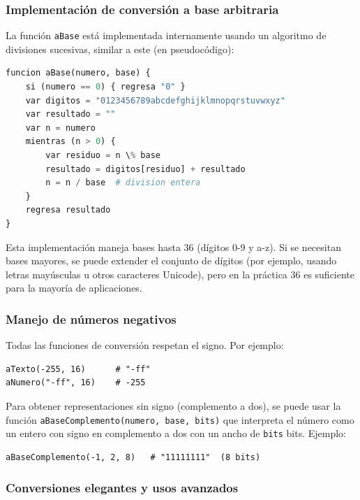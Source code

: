 \documentclass[12pt]{article}
\begin{document}
\subsubsection{Implementación de conversión a base arbitraria}

La función \texttt{aBase} está implementada internamente usando un algoritmo de divisiones sucesivas, similar a este (en pseudocódigo):

\begin{lstlisting}[language=Python]
funcion aBase(numero, base) {
    si (numero == 0) { regresa "0" }
    var digitos = "0123456789abcdefghijklmnopqrstuvwxyz"
    var resultado = ""
    var n = numero
    mientras (n > 0) {
        var residuo = n \% base
        resultado = digitos[residuo] + resultado
        n = n / base  # division entera
    }
    regresa resultado
}
\end{lstlisting}

Esta implementación maneja bases hasta 36 (dígitos 0-9 y a-z). Si se necesitan bases mayores, se puede extender el conjunto de dígitos (por ejemplo, usando letras mayúsculas u otros caracteres Unicode), pero en la práctica 36 es suficiente para la mayoría de aplicaciones.

\subsubsection{Manejo de números negativos}

Todas las funciones de conversión respetan el signo. Por ejemplo:
\begin{lstlisting}
aTexto(-255, 16)      # "-ff"
aNumero("-ff", 16)    # -255
\end{lstlisting}

Para obtener representaciones sin signo (complemento a dos), se puede usar la función \texttt{aBaseComplemento(numero, base, bits)} que interpreta el número como un entero con signo en complemento a dos con un ancho de \texttt{bits} bits. Ejemplo:
\begin{lstlisting}
aBaseComplemento(-1, 2, 8)   # "11111111"  (8 bits)
\end{lstlisting}

\subsubsection{Conversiones elegantes y usos avanzados}
\end{document}
